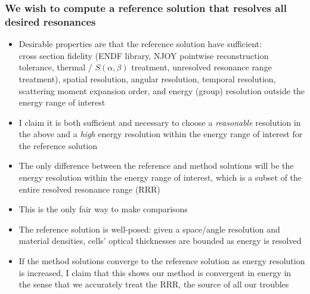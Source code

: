 \documentclass[compress,10pt]{beamer}
\newcommand{\backupend}{
    \setcounter{framenumber}{\value{finalframe}}
}
\begin{document}
\begin{frame}
    \frametitle{We wish to compute a reference solution that resolves all desired resonances}

    \centering
    \begin{block}{}
        \begin{itemize}
            \item<1-> Desirable properties are that the reference solution have sufficient: \\ {\footnotesize cross section fidelity (ENDF library, NJOY pointwise reconstruction tolerance, thermal / $S(\alpha,\beta)$ treatment, unresolved resonance range treatment), spatial resolution, angular resolution, temporal resolution, scattering moment expansion order, and energy (group) resolution outside the energy range of interest}
            \item<2-> I claim it is both sufficient and necessary to choose a \textit{reasonable} resolution in the above and a \textit{high} energy resolution within the energy range of interest for the reference solution
            \item<3-> The only difference between the reference and method solutions will be the energy resolution within the energy range of interest, which is a subset of the entire resolved resonance range (RRR)
            \item<4-> This is the only fair way to make comparisons %
            \item<5-> The reference solution is well-posed: given a space/angle resolution and material densities, cells' optical thicknesses are bounded as energy is resolved
            \item<6-> If the method solutions converge to the reference solution as energy resolution is increased, I claim that this shows our method is convergent in energy in the sense that we accurately treat the RRR, the source of all our troubles
        \end{itemize}
    \end{block}

\end{frame}

\backupend
\end{document}
